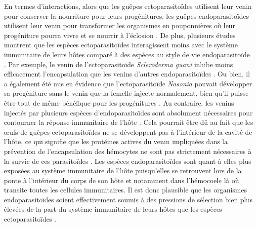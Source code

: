 En termes d'interactions, alors que les guêpes ectoparasitoïdes utilisent leur venin pour conserver la nourriture pour leurs progénitures, les guêpes endoparasitoïdes utilisent leur venin pour transformer les organismes en pouponnières où leur progéniture pourra vivre et se nourrir à l'éclosion \citep{moreau_chapter_2009,schendel_diversity_2019}. De plus, plusieurs études montrent que les espèces ectoparasitoïdes interagissent moins avec le système immunitaire de leurs hôtes comparé à des espèces au style de vie endoparasitoïde \citep{li_parasitism_2018}. Par exemple, le venin de l'ectoparasitoïde \textit{Scleroderma guani} inhibe moins efficacement l'encapsulation que les venins d'autres endoparasitoïdes \citep{cai_parasitism_2004, richards_venom_2000}. Ou bien, il a également été mis en évidence que l'ectoparasitoïde \textit{Nasonia} pouvait développer sa progéniture sans le venin que la femelle injecte normalement, bien qu'il puisse être tout de même bénéfique pour les progénitures \citep{martinson_venom_2018}. Au contraire, les venins injectés par plusieurs espèces d'endoparasitoïdes sont absolument nécessaires pour contourner la réponse immunitaire de l'hôte \citep{guillot_rocalyx_1972,li_parasitism_2018, lee_chapter_2009, small_introduction_2012}. Cela pourrait être dû au fait que les œufs de guêpes ectoparasitoïdes ne se développent pas à l'intérieur de la cavité de l'hôte, ce qui signifie que les protéines actives du venin impliquées dans la prévention de l'encapsulation des hémocytes ne sont pas strictement nécessaires à la survie de ces parasitoïdes \citep{li_parasitism_2018}. Les espèces endoparasitoïdes sont quant à elles plus exposées au système immunitaire de l'hôte puisqu'elles se retrouvent lors de la ponte à l'intérieur du corps de son hôte et notamment dans l'hémocoele là où transite toutes les cellules immunitaires. Il est donc plausible que les organismes endoparasitoïdes soient effectivement soumis à des pressions de sélection bien plus élevées de la part du système immunitaire de leurs hôtes que les espèces ectoparasitoïdes \citep{li_parasitism_2018}.\\

